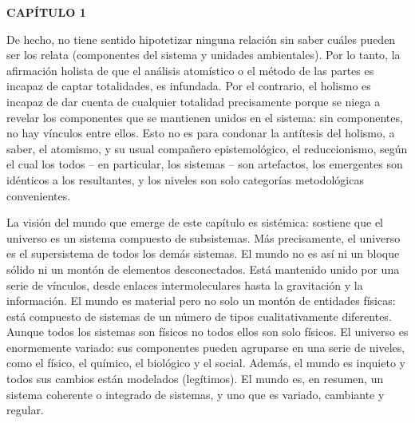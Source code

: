 \newpage
\fancyhf{}
\fancyhead[l]{\thepage}
\begin{center}
{\fontsize{13}{16}\selectfont \textbf{CAPÍTULO 1}}
\end{center}
\vspace{0.5cm}

{\fontsize{13}{16}\selectfont
De hecho, no tiene sentido hipotetizar ninguna relación sin saber cuáles pueden ser los relata 
(componentes del sistema y unidades ambientales). Por lo tanto, la afirmación holista de 
que el análisis atomístico o el método de las partes es incapaz de captar totalidades, es infundada. 
Por el contrario, el holismo es incapaz de dar cuenta de cualquier totalidad precisamente porque se niega 
a revelar los componentes que se mantienen unidos en el sistema: sin componentes, no hay vínculos entre ellos. 
Esto no es para condonar la antítesis del holismo, a saber, el atomismo, y su usual compañero epistemológico, el reduccionismo, 
según el cual los todos – en particular, los sistemas – son artefactos, los emergentes son idénticos a los resultantes, 
y los niveles son solo categorías metodológicas convenientes.

La visión del mundo que emerge de este capítulo es sistémica: sostiene que el universo es un sistema compuesto de subsistemas. 
Más precisamente, el universo es el supersistema de todos los demás sistemas. El mundo no es así ni un bloque sólido ni un montón de elementos desconectados. 
Está mantenido unido por una serie de vínculos, desde enlaces intermoleculares hasta la gravitación y la información. El mundo es material pero no solo un montón de entidades físicas: 
está compuesto de sistemas de un número de tipos cualitativamente diferentes. Aunque todos los sistemas son físicos no todos ellos son solo físicos. 
El universo es enormemente variado: sus componentes pueden agruparse en una serie de niveles, como el físico, el químico, el biológico y el social. Además, el mundo es inquieto y todos sus cambios están modelados (legítimos).
El mundo es, en resumen, un sistema coherente o integrado de sistemas, y uno que es variado, cambiante y regular.
}